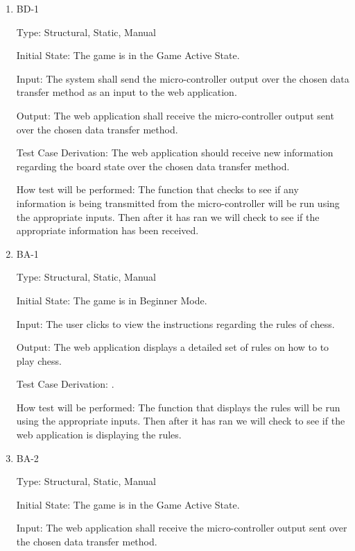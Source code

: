 \documentclass[12pt, titlepage]{article}
\begin{document}
\begin{enumerate}
    \item{BD-1\\}

    Type: Structural, Static, Manual
                      
    Initial State: The game is in the Game Active State.
                        
    Input: The system shall send the micro-controller output over the chosen data transfer
    method as an input to the web application.
                        
    Output: The web application shall receive the micro-controller output sent over the chosen data transfer
    method.
                        
    Test Case Derivation: The web application should receive new information regarding the board state over the chosen data transfer method. 

    How test will be performed: The function that checks to see if any information is being transmitted from the micro-controller
    will be run using the appropriate inputs. Then after it has ran we will check to see if the appropriate information has been received.

    \item{BA-1\\}

    Type: Structural, Static, Manual
                      
    Initial State: The game is in Beginner Mode.
                        
    Input: The user clicks to view the instructions regarding the rules of chess.
                        
    Output: The web application displays a detailed set of rules on how to to play chess.
                        
    Test Case Derivation: . 

    How test will be performed: The function that displays the rules
    will be run using the appropriate inputs. Then after it has ran we will check to see if the web application is displaying the rules.

    \item{BA-2\\}

    Type: Structural, Static, Manual
                      
    Initial State: The game is in the Game Active State.
                        
    Input: The web application shall receive the micro-controller output sent over the chosen data transfer
    method.
                        

\end{enumerate}
\end{document}
